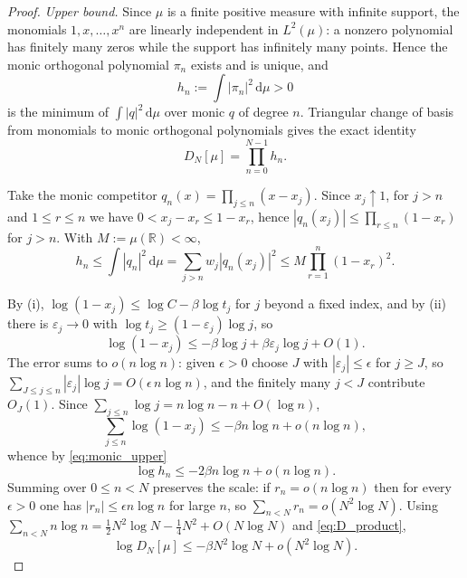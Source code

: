 \documentclass[11pt]{amsart}
\numberwithin{equation}{section}
\theoremstyle{plain}
\theoremstyle{definition}
\theoremstyle{remark}
\newcommand{\dd}{\,\mathrm d}
\begin{document}
\begin{proof}
\emph{Upper bound.} Since $\mu$ is a finite positive measure with infinite support, the monomials
$1,x,\dots,x^{n}$ are linearly independent in $L^{2}(\mu)$: a nonzero polynomial has finitely many
zeros while the support has infinitely many points. Hence the monic orthogonal polynomial $\pi_{n}$
exists and is unique, and
\[
h_{n}:=\int|\pi_{n}|^{2}\dd\mu>0
\]
is the minimum of $\int|q|^{2}\dd\mu$ over monic $q$ of degree $n$. Triangular change of basis from
monomials to monic orthogonal polynomials gives the exact identity
\begin{equation}
D_{N}[\mu]=\prod_{n=0}^{N-1}h_{n}.
\label{eq:D_product}
\end{equation}

Take the monic competitor $q_{n}(x)=\prod_{j\le n}(x-x_{j})$. Since $x_{j}\uparrow1$, for $j>n$ and
$1\le r\le n$ we have $0<x_{j}-x_{r}\le1-x_{r}$, hence
$|q_{n}(x_{j})|\le\prod_{r\le n}(1-x_{r})$ for $j>n$. With $M:=\mu(\mathbb R)<\infty$,
\begin{equation}
h_{n}\le\int|q_{n}|^{2}\dd\mu=\sum_{j>n}w_{j}|q_{n}(x_{j})|^{2}
\le M\prod_{r=1}^{n}(1-x_{r})^{2}.
\label{eq:monic_upper}
\end{equation}

By (i), $\log(1-x_{j})\le\log C-\beta\log t_{j}$ for $j$ beyond a fixed index, and by (ii) there is
$\varepsilon_{j}\to0$ with $\log t_{j}\ge(1-\varepsilon_{j})\log j$, so
\begin{equation}
\log(1-x_{j})\le-\beta\log j+\beta\varepsilon_{j}\log j+O(1).
\end{equation}
The error sums to $o(n\log n)$: given $\epsilon>0$ choose $J$ with $|\varepsilon_{j}|\le\epsilon$ for
$j\ge J$, so $\sum_{J\le j\le n}|\varepsilon_{j}|\log j=O(\epsilon\, n\log n)$, and the finitely many
$j<J$ contribute $O_{J}(1)$. Since $\sum_{j\le n}\log j=n\log n-n+O(\log n)$,
\[
\sum_{j\le n}\log(1-x_{j})\le-\beta n\log n+o(n\log n),
\]
whence by \eqref{eq:monic_upper}
\begin{equation}
\log h_{n}\le-2\beta n\log n+o(n\log n).
\label{eq:h_upper}
\end{equation}
Summing over $0\le n<N$ preserves the scale: if $r_{n}=o(n\log n)$ then for every $\epsilon>0$ one
has $|r_{n}|\le\epsilon n\log n$ for large $n$, so $\sum_{n<N}r_{n}=o(N^{2}\log N)$. Using
$\sum_{n<N}n\log n=\tfrac12N^{2}\log N-\tfrac14N^{2}+O(N\log N)$ and \eqref{eq:D_product},
\begin{equation}
\log D_{N}[\mu]\le-\beta N^{2}\log N+o(N^{2}\log N).
\label{eq:det_upper}
\end{equation}


\end{proof}
\end{document}
